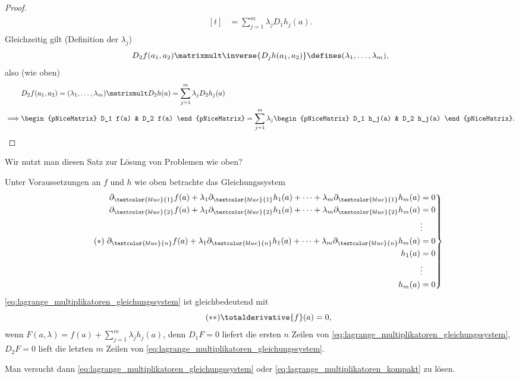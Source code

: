 \begin{proof}
\begin{align*}
\begin{aligned}[t]
      &=\sum_{j=1}^{m}\lambda_j D_1 h_j(a).
    \end{aligned}
  \end{align*}
  Gleichzeitig gilt (Definition der \( \lambda_j \))
  \begin{equation}
    D_2 f(a_1,a_2)\matrixmult\inverse{D_j h(a_1,a_2)}\defines (\lambda_1,\dotsc,\lambda_m),
  \end{equation}
  also (wie oben)
  \begin{align*}
    &D_2 f(a_1,a_2)=(\lambda_1,\dotsc,\lambda_m)\matrixmult D_2h(a)=\sum_{j=1}^{m}\lambda_j D_2 h_j(a)\\
    \implies &\begin{pNiceMatrix} D_1 f(a) & D_2 f(a) \end{pNiceMatrix}= \sum_{j=1}^{m} \lambda_j \begin{pNiceMatrix} D_1 h_j(a) & D_2 h_j(a) \end{pNiceMatrix}.
  \end{align*}
\end{proof}
Wir nutzt man diesen Satz zur Lösung von Problemen wie oben?
\begin{bemerkung}
  Unter Voraussetzungen an \( f \) und \( h \) wie oben betrachte das Gleichungssystem 
  \begin{gather}
    \tag{\( * \)}\label{eq:lagrange_multiplikatoren_gleichungssystem}\left.\begin{aligned}
      \partial_{\textcolor{blue}{1}}f(a)+\lambda_1\partial_{\textcolor{blue}{1}} h_1(a)+\dotsb+\lambda_m \partial_{\textcolor{blue}{1}} h_m(a)&=0\\
      \partial_{\textcolor{blue}{2}}f(a)+\lambda_1\partial_{\textcolor{blue}{2}} h_1(a)+\dotsb+\lambda_m \partial_{\textcolor{blue}{2}} h_m(a)&=0\\
      &\vdots\\
      \partial_{\textcolor{blue}{n}}f(a)+\lambda_1\partial_{\textcolor{blue}{n}} h_1(a)+\dotsb+\lambda_m \partial_{\textcolor{blue}{n}} h_m(a)&=0\\
      h_1(a)&=0\\
      &\vdots\\
      h_m(a)&=0
    \end{aligned}\right\}
  \end{gather}
  \eqref{eq:lagrange_multiplikatoren_gleichungssystem} ist gleichbedeutend mit
  \begin{equation*}
    \tag{\( ** \)} \label{eq:lagrange_multiplikatoren_kompakt}\totalderivative{f}(a)=0,
  \end{equation*}
  wenn \( F(a,\lambda)=f(a)+\sum_{j=1}^{m}\lambda_j h_j(a) \), denn \( D_1 F=0 \) liefert die ersten \( n \) Zeilen von \eqref{eq:lagrange_multiplikatoren_gleichungssystem}, \( D_2 F=0 \) lieft die letzten \( m \) Zeilen von \eqref{eq:lagrange_multiplikatoren_gleichungssystem}.

  Man versucht dann \eqref{eq:lagrange_multiplikatoren_gleichungssystem} oder \eqref{eq:lagrange_multiplikatoren_kompakt} zu lösen.
\end{bemerkung}
